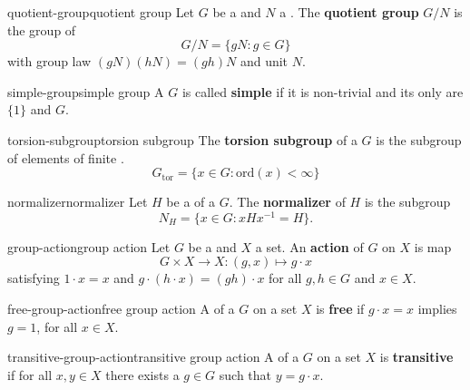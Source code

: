 \begin{topic}{quotient-group}{quotient group}
    Let $G$ be a  and $N$ a . The \textbf{quotient group} $G/N$ is the group of 
    \[ G/N = \{ gN : g \in G \} \]
    with group law $(gN)(hN) = (gh)N$ and unit $N$.
\end{topic}

\begin{topic}{simple-group}{simple group}
    A  $G$ is called \textbf{simple} if it is non-trivial and its only  are $\{ 1 \}$ and $G$.
\end{topic}

\begin{topic}{torsion-subgroup}{torsion subgroup}
    The \textbf{torsion subgroup} of a  $G$ is the subgroup of elements of finite .
    \[ G_{\text{tor}} = \{ x \in G : \text{ord}(x) < \infty \} \]
\end{topic}

\begin{topic}{normalizer}{normalizer}
    Let $H$ be a  of a  $G$. The \textbf{normalizer} of $H$ is the subgroup
    \[ N_H = \{ x \in G : x H x^{-1} = H \} . \]
\end{topic}

\begin{topic}{group-action}{group action}
    Let $G$ be a  and $X$ a set. An \textbf{action} of $G$ on $X$ is map
    \[ G \times X \to X : (g, x) \mapsto g \cdot x \]
    satisfying $1 \cdot x = x$ and $g \cdot (h \cdot x) = (gh) \cdot x$ for all $g, h \in G$ and $x \in X$.
\end{topic}

\begin{topic}{free-group-action}{free group action}
    A  of a  $G$ on a set $X$ is \textbf{free} if $g \cdot x = x$ implies $g = 1$, for all $x \in X$.
\end{topic}

\begin{topic}{transitive-group-action}{transitive group action}
    A  of a  $G$ on a set $X$ is \textbf{transitive} if for all $x, y \in X$ there exists a $g \in G$ such that $y = g \cdot x$.
\end{topic}

